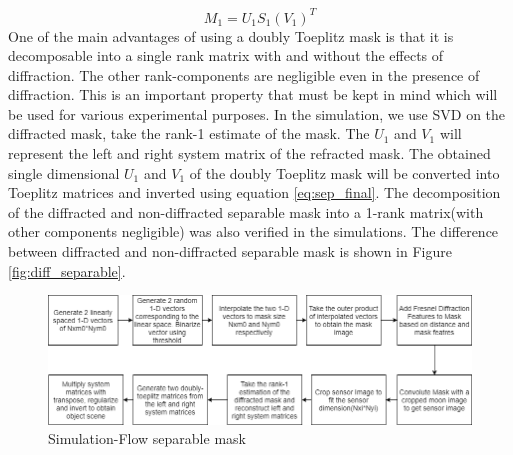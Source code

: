 \begin{equation}
\label{eq:svd_2}
M_{1} = U_{1}S_1(V_{1})^T
\end{equation}
One of the main advantages of using a doubly Toeplitz mask is that it is decomposable into a single rank matrix with and without the effects of diffraction. The other rank-components are negligible even in the presence of diffraction. This is an important property that must be kept in mind which will be used for various experimental purposes.  In the simulation, we use SVD on the diffracted mask, take the rank-1 estimate of the mask. The $U_1$ and $V_1$ will represent the left and right system matrix of the refracted mask. The obtained single dimensional $U_1$ and $V_1$ of the doubly Toeplitz mask will be converted into Toeplitz matrices and inverted using equation \ref{eq:sep_final}. The decomposition of the diffracted and non-diffracted separable mask into a 1-rank matrix(with other components negligible) was also verified in the simulations.
The difference between diffracted and non-diffracted separable mask is shown in Figure \ref{fig:diff_separable}.
\begin{figure}[ht]
\includegraphics[width=\linewidth]{pics/sep_mask_sim_flow}
\caption{Simulation-Flow separable mask}
\label{fig:sep_sim}
\end{figure}
